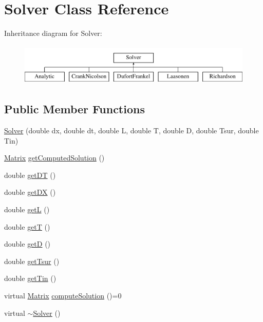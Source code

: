 \hypertarget{classSolver}{}\section{Solver Class Reference}
\label{classSolver}
Inheritance diagram for Solver\+:\begin{figure}[H]
\begin{center}
\leavevmode
\includegraphics[height=2.000000cm]{classSolver}
\end{center}
\end{figure}
\subsection*{Public Member Functions}
\begin{DoxyCompactItemize}
\item 
\mbox{\hyperlink{classSolver_a3a1edb79e38781d40e5be114c7a549ba}{Solver}} (double dx, double dt, double L, double T, double D, double Tsur, double Tin)
\item 
\mbox{\hyperlink{classMatrix}{Matrix}} \mbox{\hyperlink{classSolver_aafe88ce4130c001052e5d93c1681f90f}{get\+Computed\+Solution}} ()
\item 
double \mbox{\hyperlink{classSolver_a560a332c3193d5709e1e5eb44bfaa322}{get\+DT}} ()
\item 
double \mbox{\hyperlink{classSolver_a6a05cda84ae4e3f3a187cf69f1407d81}{get\+DX}} ()
\item 
double \mbox{\hyperlink{classSolver_afb4f245f8c8109afb3301942d30b4544}{getL}} ()
\item 
double \mbox{\hyperlink{classSolver_a7a09182372f91099da1cba8b1527e4c7}{getT}} ()
\item 
double \mbox{\hyperlink{classSolver_a3b4da24979dd1c316c860749bbf6e3af}{getD}} ()
\item 
double \mbox{\hyperlink{classSolver_a652cc726a9f3e46239e3a2953e95495c}{get\+Tsur}} ()
\item 
double \mbox{\hyperlink{classSolver_ac091deb09ce1bb4bf2f70b6af3a2d6c2}{get\+Tin}} ()
\item 
virtual \mbox{\hyperlink{classMatrix}{Matrix}} \mbox{\hyperlink{classSolver_a0f4ecfaed825407019995b5176e25748}{compute\+Solution}} ()=0
\item 
virtual \mbox{\hyperlink{classSolver_a14f7014dd6e46e3990dea30b5ad3c087}{$\sim$\+Solver}} ()
\end{DoxyCompactItemize}
